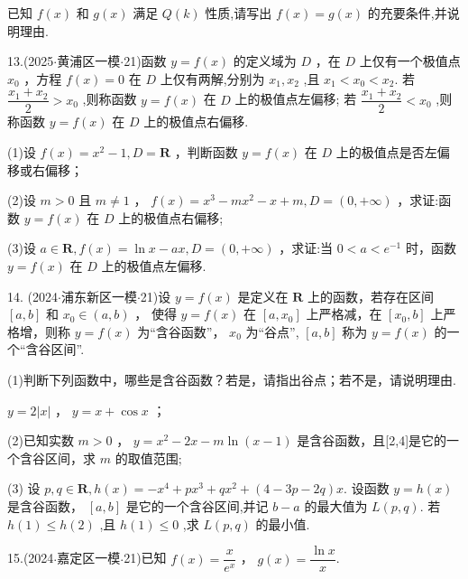 已知 $f\left( x\right)$ 和 $g\left( x\right)$ 满足 $Q\left( k\right)$ 性质,请写出 $f\left( x\right)  = g\left( x\right)$ 的充要条件,并说明理由.

13.(2025$\cdot$黄浦区一模$\cdot$21)函数 $y = f\left( x\right)$ 的定义域为 $D$ ，在 $D$ 上仅有一个极值点 ${x}_{0}$ ，方程 $f\left( x\right)  = 0$ 在 $D$ 上仅有两解,分别为 ${x}_{1},{x}_{2}$ ,且 ${x}_{1} < {x}_{0} < {x}_{2}$. 若 $\dfrac{{x}_{1} + {x}_{2}}{2} > {x}_{0}$ ,则称函数 $y = f\left( x\right)$ 在 $D$ 上的极值点左偏移; 若 $\dfrac{{x}_{1} + {x}_{2}}{2} < {x}_{0}$ ,则称函数 $y = f\left( x\right)$ 在 $D$ 上的极值点右偏移.

(1)设 $f\left( x\right)  = {x}^{2} - 1,D = \mathbf{R}$ ，判断函数 $y = f\left( x\right)$ 在 $D$ 上的极值点是否左偏移或右偏移；

(2)设 $m > 0$ 且 $m \neq  1$ ， $f\left( x\right)  = {x}^{3} - m{x}^{2} - x + m,D = \left( {0, + \infty }\right)$ ，求证:函数 $y = f\left( x\right)$ 在 $D$ 上的极值点右偏移;

(3)设 $a \in  \mathbf{R},f\left( x\right)  = \ln x - {ax},D = \left( {0, + \infty }\right)$ ，求证:当 $0 < a < {{e}}^{-1}$ 时，函数 $y = f\left( x\right)$ 在 $D$ 上的极值点左偏移.

14. (2024$\cdot$浦东新区一模$\cdot$21)设 $y = f\left( x\right)$ 是定义在 $\mathbf{R}$ 上的函数，若存在区间 $\left\lbrack  {a,b}\right\rbrack$ 和 ${x}_{0} \in  \left( {a,b}\right)$ ， 使得 $y = f\left( x\right)$ 在 $\left\lbrack  {a,{x}_{0}}\right\rbrack$ 上严格减，在 $\left\lbrack  {{x}_{0},b}\right\rbrack$ 上严格增，则称 $y = f\left( x\right)$ 为“含谷函数”， ${x}_{0}$ 为“谷点”, $\left\lbrack  {a,b}\right\rbrack$ 称为 $y = f\left( x\right)$ 的一个“含谷区间”.

(1)判断下列函数中，哪些是含谷函数？若是，请指出谷点；若不是，请说明理由.

   $y = 2\left| x\right|$ ，   $y = x + \cos x$ ；

(2)已知实数 $m > 0$ ， $y = {x}^{2} - {2x} - m\ln \left( {x - 1}\right)$ 是含谷函数，且[2,4]是它的一个含谷区间，求 $m$ 的取值范围;

(3) 设 $p,q \in  \mathbf{R},h\left( x\right)  =  - {x}^{4} + p{x}^{3} + q{x}^{2} + \left( {4 - {3p} - {2q}}\right) x$. 设函数 $y = h\left( x\right)$ 是含谷函数， $\left\lbrack  {a,b}\right\rbrack$ 是它的一个含谷区间,并记 $b - a$ 的最大值为 $L\left( {p,q}\right)$. 若 $h\left( 1\right)  \leq  h\left( 2\right)$ ,且 $h\left( 1\right)  \leq  0$ ,求 $L\left( {p,q}\right)$ 的最小值.

15.(2024$\cdot$嘉定区一模$\cdot$21)已知 $f\left( x\right)  = \dfrac{x}{{{e}}^{x}}$ ， $g\left( x\right)  = \dfrac{\ln x}{x}$.

